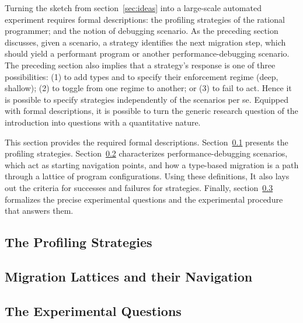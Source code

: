
Turning the sketch from section~\ref{sec:ideas} into a large-scale
automated experiment requires formal descriptions: the profiling
strategies of the rational programmer; and the notion of debugging
scenario. As the preceding section discusses, given a scenario, a strategy
identifies the next migration step, which should yield a performant
program or another performance-debugging scenario.  The preceding section
also implies that a strategy's response is one of three possibilities: (1)
to add types and to specify their enforcement regime (deep, shallow); (2)
to toggle from one regime to another; or (3) to fail to act. Hence it is
possible to specify strategies independently of the scenarios per se.
Equipped with formal descriptions, it is possible to turn the generic
research question of the introduction into questions with a quantitative
nature.

This section provides the required formal descriptions.
Section~\ref{subsec:strategies} presents the profiling strategies.
Section~\ref{subsec:lattice} characterizes performance-debugging
scenarios, which act as starting navigation points,
 and how a type-based migration is a path
through a lattice of program configurations. Using these definitions, It
also lays out the criteria for successes and failures for strategies. Finally,
section~\ref{subsec:questions} formalizes the precise experimental
questions and the experimental procedure that answers them.


\def\exp#1#2{\subsection{#2} \label{subsec:#1} }

\exp{strategies}{The Profiling Strategies}
\exp{lattice}{Migration Lattices and their Navigation}
\exp{questions}{The Experimental Questions}
